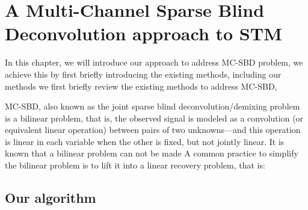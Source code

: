 \section{A Multi-Channel Sparse Blind Deconvolution approach to STM}

In this chapter, we will introduce our approach to address \ac{MC-SBD} problem, we achieve this by first briefly introducing the existing methods, including our methods    
we first briefly review the existing methods to address \ac{MC-SBD}, 

\ac{MC-SBD}, also known as the joint sparse blind deconvolution/demixing problem is a bilinear problem, that is, the observed signal is modeled as a convolution (or equivalent linear operation) between pairs of two unknowns—and this operation is linear in each variable when the other is fixed, but not jointly linear. It is known that a bilinear problem can not be made 
A common practice to simplify the bilinear problem is to lift it into a linear recovery problem, that is: 


\subsection{Our algorithm}

